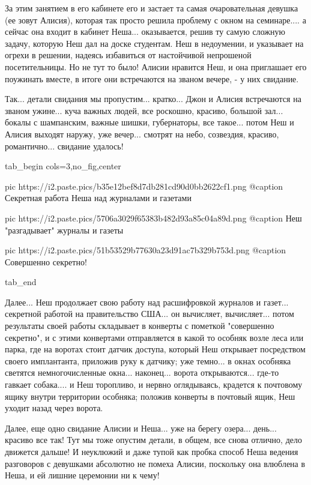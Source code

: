 За этим занятием в его кабинете его и застает та самая очаровательная девушка
(ее зовут Алисия), которая так просто решила проблему с окном на семинаре.... а
сейчас она входит в кабинет Неша...  оказывается, решив ту самую сложную
задачу, которую Неш дал на доске студентам.  Неш в недоумении, и указывает на
огрехи в решении, надеясь избавиться от настойчивой непрошеной посетительницы.
Но не тут то было! Алисии нравится Неш, и она приглашает его поужинать вместе,
в итоге они встречаются на званом вечере, - у них свидание.

Так... детали свидания мы пропустим... кратко... Джон и Алисия встречаются на званом ужине...
куча важных людей, все роскошно, красиво, большой зал... бокалы с шампанским, важные шишки, губернаторы,
все такое... потом Неш и Алисия выходят наружу, уже вечер... смотрят на небо, созвездия, красиво, романтично...
свидание удалось!

\ifcmt
  tab_begin cols=3,no_fig,center

     pic https://i2.paste.pics/b35e12bef8d7db281cd90d0bb2622cf1.png
		 @caption Секретная работа Неша над журналами и газетами

		 pic https://i2.paste.pics/5706a3029f65383b482d93a85c04a89d.png
		 @caption Неш "разгадывает" журналы и газеты

		 pic https://i2.paste.pics/51b53529b77630a23d91ac7b329b753d.png
		 @caption Совершенно секретно!

  tab_end
\fi

Далее... Неш продолжает свою работу над расшифровкой журналов и газет...
секретной работой на правительство США... он вычисляет, вычисляет... потом
результаты своей работы складывает в конверты с пометкой "совершенно секретно",
и с этими конвертами отправляется в какой то особняк возле леса или парка, где
на воротах стоит датчик доступа, который Неш открывает посредством своего
имплантанта, приложив руку к датчику; уже темно... в окнах особняка светятся немногочисленные окна... 
наконец... ворота открываются... где-то гавкает собака.... и Неш торопливо, и
нервно оглядываясь, крадется к почтовому ящику внутри территории особняка;
положив конверты в почтовый ящик, Неш уходит назад через ворота. 

Далее, еще одно свидание Алисии и Неша... уже на берегу озера... день...
красиво все так!  Тут мы тоже опустим детали, в общем, все снова отлично, дело
движется дальше! И неуклюжий и даже тупой как пробка способ Неша ведения
разговоров с девушками абсолютно не помеха Алисии, поскольку она влюблена в
Неша, и ей лишние церемонии ни к чему!

